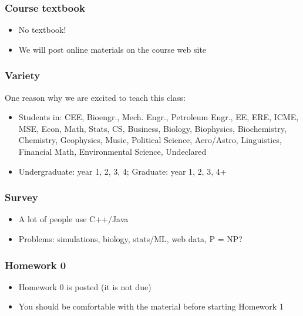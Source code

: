 \documentclass{beamer}
\begin{document}
\begin{frame}
\frametitle{Course textbook}

\begin{itemize}
\setlength{\itemsep}{0.2in}
\item{No textbook!}
\item{We will post online materials on the course web site}
\end{itemize}

\end{frame}


\begin{frame}
\frametitle{Variety}
One reason why we are excited to teach this class:

\begin{itemize}
\item{Students in: CEE, Bioengr., Mech. Engr., Petroleum Engr., EE, ERE, ICME, MSE, Econ, Math, Stats, CS, Business, Biology, Biophysics, Biochemistry, Chemistry, Geophysics, Music, Political Science, Aero/Astro, Linguistics, Financial Math, Environmental Science, Undeclared}
\item{Undergraduate: year 1, 2, 3, 4; Graduate: year 1, 2, 3, 4+}
\end{itemize}

\end{frame}

\begin{frame}
\frametitle{Survey}

\begin{itemize}
\setlength{\itemsep}{0.2in}
\item{A lot of people use C++/Java}
\item{Problems: simulations, biology, stats/ML, web data, P = NP?}
\end{itemize}


\end{frame}


\begin{frame}
\frametitle{Homework 0}

\begin{itemize}
\item{Homework 0 is posted (it is not due)}
\item{You should be comfortable with the material before starting Homework 1}
\end{itemize}

\end{frame}
\end{document}
